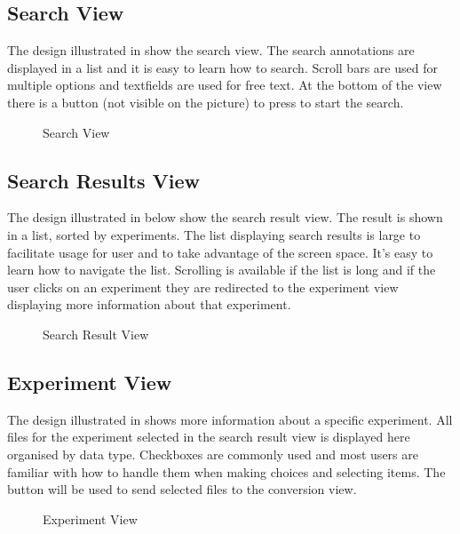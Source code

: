 \subsection{Search View}
The design illustrated in  show the search view. The search annotations are displayed in a list and it is easy to learn how to search. Scroll bars are used for multiple options and textfields are used for free text. At the bottom of the view there is a button (not visible on the picture) to press to start the search.

\begin{figure}[ht]
\caption{Search View}
\label{fig:and_search}
\end{figure}
\FloatBarrier

\subsection{Search Results View}
The design illustrated in  below show the search result view. The result is shown in a list, sorted by experiments. The list displaying search results is large to facilitate usage for user and to take advantage of the screen space. It's easy to learn how to navigate the list. Scrolling is available if the list is long and if the user clicks on an experiment they are redirected to the experiment view displaying more information about that experiment.

\begin{figure}[ht]
\caption{Search Result View}
\label{fig:and_result}
\end{figure}
\FloatBarrier

\subsection{Experiment View}
The design illustrated in  shows more information about a specific experiment. All files for the experiment selected in the search result view is displayed here organised by data type. Checkboxes are commonly used and most users are familiar with how to handle them when making choices and selecting items. The button  will be used to send selected files to the conversion view.

\begin{figure}[ht]
\caption{Experiment View}
\label{fig:and_experiment}
\end{figure}
\FloatBarrier

